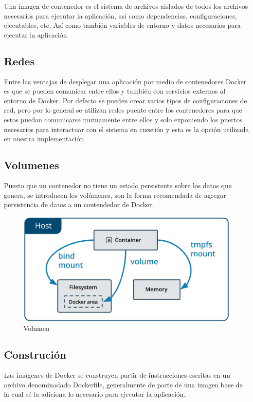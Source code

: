Una imagen de contenedor es el sistema de archivos aislados de todos los archivos necesarios para ejecutar la aplicación, así como dependencias, configuraciones, ejecutables, etc. Así como también variables de entorno y datos necesarios para ejecutar la aplicación. \cite{Docker}  

\subsection{Redes}

Entre las ventajas de desplegar una aplicación por medio de contenedores Docker es que se pueden comunicar entre ellos y también con servicios externos al entorno de Docker. Por defecto se pueden crear varios tipos de configuraciones de red, pero por lo general se utilizan redes puente entre los contenedores para que estos puedan comunicarse mutuamente entre ellos y solo exponiendo los puertos necesarios para interactuar con el sistema en cuestión y esta es la opción utilizada en nuestra implementación. \cite{Docker}  

\subsection{Volumenes}
Puesto que un contenedor no tiene un estado persistente sobre los datos que genera, se introducen los volúmenes, son la forma recomendada de agregar persistencia de datos a un contendedor de Docker. 
\cite{Docker} 

\begin{figure}[ht]
    \centering
    \includegraphics[width=\textwidth]{imagenes/cap4/docker-volume.png}
    \caption{Volumen}
    \label{fig:volume_diagram}
\end{figure}

\subsection{Construción}
Las imágenes de Docker se construyen partir de instrucciones escritas en un archivo denominadado Dockerfile, 
generalmente de parte de una imagen base de la cual sé la adiciona lo necesario para ejecutar la aplicación.
\cite{Docker}


